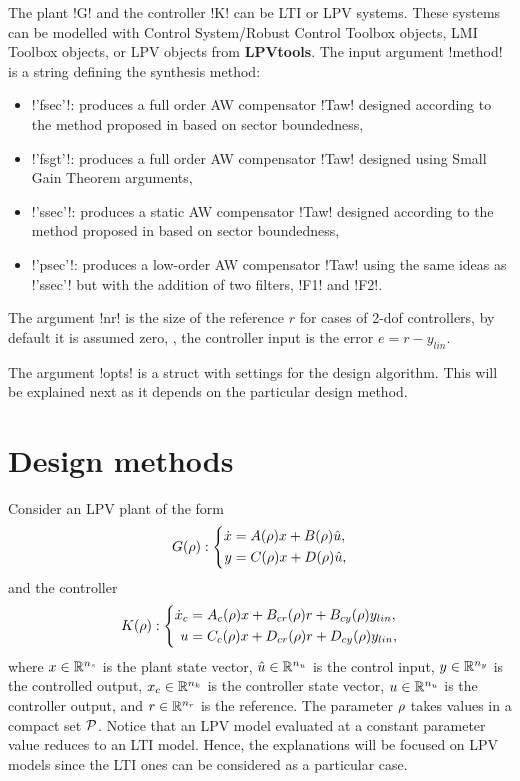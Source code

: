 \documentclass[fleqn,11pt]{article}
\newcommand{\lpvtool}{\textbf{LPVtools}\xspace}
\begin{document}
The plant !G! and the controller !K! can be LTI or LPV systems. These systems can be modelled with Control System/Robust Control Toolbox objects, LMI Toolbox objects, or LPV objects from \lpvtool. The input argument !method! is a string defining the synthesis method:
\begin{itemize}
    \item !'fsec'!: produces a full order AW compensator !Taw! designed according to the method proposed in \citep{Skogestad2005} based on sector boundedness,
    \item !'fsgt'!: produces a full order AW compensator !Taw! designed using Small Gain Theorem arguments,
    \item !'ssec'!: produces a static AW compensator !Taw! designed according to the method proposed in \citep{Turner2004} based on sector boundedness,
    \item !'psec'!: produces a low-order AW compensator !Taw! using the same ideas as !'ssec'! but with the addition of two filters, !F1! and !F2!.
\end{itemize}

The argument !nr! is the size of the reference $r$ for cases of 2-dof controllers, by default it is assumed zero, \ie, the controller input is the error $e=r-y_{lin}$.

The argument !opts! is a struct with settings for the design algorithm. This will be explained next as it depends on the particular design method.

\section{Design methods}\label{sec:design}

Consider an LPV plant of the form
\begin{equation}\label{eq:Plant}
    G(\rho):\left\{
        \begin{aligned}
            \dot x &= A(\rho) x + B(\rho)\hat{u},\\
                 y &= C(\rho)x + D(\rho)\hat{u},
        \end{aligned}
        \right.
\end{equation}
and the controller
\begin{equation}\label{eq:Ctrller}
    K(\rho):\left\{
        \begin{aligned}
            \dot x_c &= A_c(\rho) x + B_{cr}(\rho) r + B_{cy}(\rho) y_{lin},\\
                  u  &= C_c(\rho) x + D_{cr}(\rho) r + D_{cy}(\rho) y_{lin},
        \end{aligned}
        \right.
\end{equation}
where $x\in\mathbb{R}^{n_s}$ is the plant state vector, $\hat{u}\in\mathbb{R}^{n_u}$ is the control input, $y\in\mathbb{R}^{n_y}$ is the controlled output, $x_c\in\mathbb{R}^{n_k}$ is the controller state vector, $u\in\mathbb{R}^{n_u}$ is the controller output, and $r\in\mathbb{R}^{n_r}$ is the reference. The parameter $\rho$ takes values in a compact set $\mathcal{P}$. Notice that an LPV model evaluated at a constant parameter value reduces to an LTI model. Hence, the explanations will be focused on LPV models since the LTI ones can be considered as a particular case.
\end{document}
